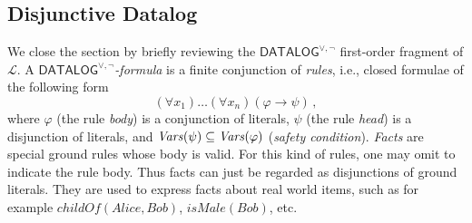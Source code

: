 \documentclass[a4paper]{llncs}
\newcommand{\DisjDatalog}{\ensuremath{\mathsf{DATALOG}^{\vee,\neg}}\xspace}
\newcommand{\Lang}{\ensuremath{\mathcal{L}\xspace}} %
\newcommand{\hinter}{\ensuremath{\mathcal{H}}}
\begin{document}
\subsection{Disjunctive Datalog}

We close the section by briefly reviewing the \DisjDatalog first-order
fragment of $\Lang$.  A \emph{\DisjDatalog-formula} is a finite
conjunction of \emph{rules}, i.e., closed formulae of the following
form
\[
  (\forall x_1)\ldots(\forall x_n)(\varphi \rightarrow \psi)\,, \]
%
where $\varphi$ (the rule \emph{body}) is a conjunction of literals,
$\psi$ (the rule \emph{head}) is a disjunction of literals, and
$\mathit{Vars}(\psi) \subseteq \mathit{Vars}(\varphi)$ (\emph{safety 
condition}).
\emph{Facts} are special ground rules whose body is valid.  For
this kind of rules, one may omit to indicate the rule body.  Thus
facts can just be regarded as disjunctions of ground literals.  They
are used to express facts about real world items, such as for example
$\mathit{childOf}(\mathit{Alice}, \mathit{Bob})$, 
$\mathit{isMale}(\mathit{Bob})$, etc.
\end{document}
